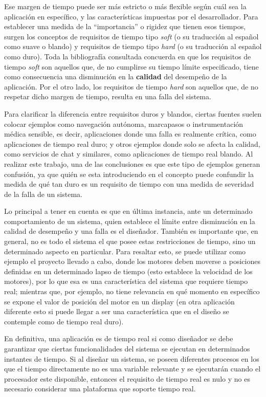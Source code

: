\documentclass{IEEEtran}
\begin{document}
Ese margen de tiempo puede ser más estricto o más flexible según cuál sea la aplicación en específico, y las características impuestas por el desarrollador. Para establecer una medida de la ``importancia'' o rigidez que tienen esos tiempos, surgen los conceptos de requisitos de tiempo tipo \textit{soft} (o su traducción al español como suave o blando) y requisitos de tiempo tipo \textit{hard} (o su traducción al español como duro). Toda la bibliografía consultada concuerda en que los requisitos de tiempo \textit{soft} son aquellos que, de no cumplirse su tiempo límite especificado, tiene como consecuencia una disminución en la \textbf{calidad} del desempeño de la aplicación. Por el otro lado, los requisitos de tiempo \textit{hard} son aquellos que, de no respetar dicho margen de tiempo, resulta en una falla del sistema.

Para clarificar la diferencia entre requisitos duros y blandos, ciertas fuentes suelen colocar ejemplos como navegación autónoma, marcapasos o instrumentación médica sensible, es decir, aplicaciones donde una falla es realmente crítica, como aplicaciones de tiempo real duro; y otros ejemplos donde solo se afecta la calidad, como servicios de chat y similares, como aplicaciones de tiempo real blando. Al realizar este trabajo, una de las conclusiones es que este tipo de ejemplos generan confusión, ya que quién se esta introduciendo en el concepto puede confundir la medida de qué tan duro es un requisito de tiempo con una medida de severidad de la falla de un sistema. 

Lo principal a tener en cuenta es que en última instancia, ante un determinado comportamiento de un sistema, quien establece el límite entre disminución en la calidad de desempeño y una falla es el diseñador. También es importante que, en general, no es todo el sistema el que posee estas restricciones de tiempo, sino un determinado aspecto en particular. Para resaltar esto, se puede utilizar como ejemplo el proyecto llevado a cabo, donde los motores deben moverse a posiciones definidas en un determinado lapso de tiempo (esto establece la velocidad de los motores), por lo que esa es una característica del sistema que requiere tiempo real; mientras que, por ejemplo, no tiene relevancia en qué momento en específico se expone el valor de posición del motor en un display (en otra aplicación diferente esto si puede llegar a ser una característica que en el diseño se contemple como de tiempo real duro).

En definitiva, una aplicación es de tiempo real si como diseñador se debe garantizar que ciertas funcionalidades del sistema se ejecutan en determinados instantes de tiempo. Si al diseñar un sistema, se poseen diferentes procesos en los que el tiempo directamente no es una variable relevante y se ejecutarán cuando el procesador este disponible, entonces el requisito de tiempo real es nulo y no es necesario considerar una plataforma que soporte tiempo real. 
\end{document}
